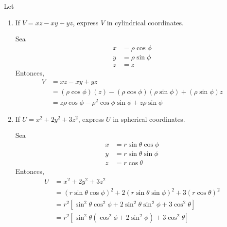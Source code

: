 \begin{problema}
    Let 
    \begin{enumerate}
        \item If $V=x z-x y+y z$, express $V$ in cylindrical coordinates.
        \begin{sol}
            Sea 
            \begin{align*}
                x &= \rho \cos\phi\\
                y &= \rho \sin \phi\\
                z &= z
            \end{align*}
            Entonces, 
            \begin{align*}
                V &=x z-x y+y z\\
                  &=(\rho \cos\phi)(z)-(\rho \cos\phi)(\rho \sin \phi)+(\rho \sin \phi)z\\
                  &= z\rho\cos\phi -\rho^2\cos\phi \sin\phi +z\rho\sin \phi
            \end{align*}
        \end{sol}

        \item If $U=x^{2}+2 y^{2}+3 z^{2}$, express $U$ in spherical coordinates.
        \begin{sol}
            Sea
            \begin{align*}
                x &= r\sin \theta \cos \phi \\
                y &= r\sin \theta \sin\phi \\
                z &= r \cos \theta
            \end{align*}
            Entonces, 
            \begin{align*}
                U &=x^{2}+2 y^{2}+3 z^{2}\\
                &= \left(r\sin \theta \cos \phi\right)^2 + 2\left(r\sin \theta \sin\phi\right)^2 +3\left(r \cos \theta\right)^2\\
                &= r^2\left[\sin^2\theta \cos^2\phi +2\sin^2\theta\sin^2 \phi +3\cos^2\theta\right]\\
                &= r^2\left[\sin^2\theta\left(\cos^2\phi +2\sin^2\phi\right) +3\cos^2\theta\right]
            \end{align*}
        \end{sol}
    \end{enumerate}
\end{problema}

